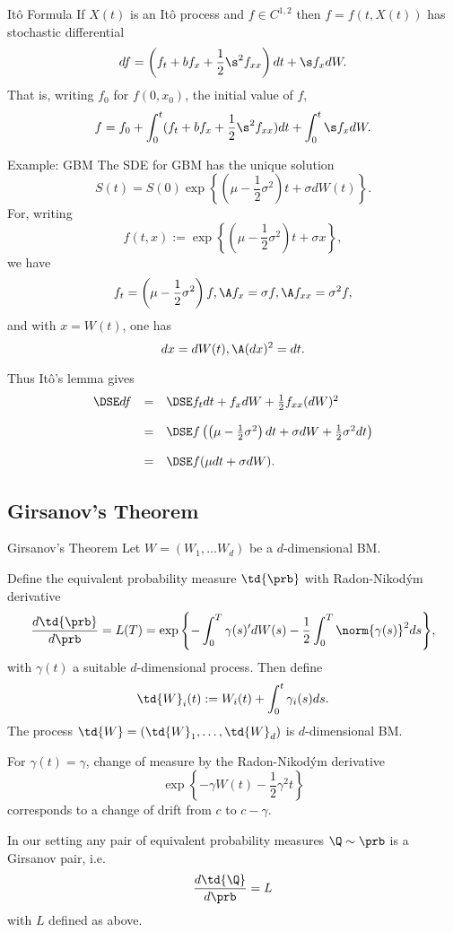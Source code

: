 It{\^o} Formula
	If $X(t)$ is an It{\^o} process  and $f \in C^{1,2}$ then
	$f = f(t,X(t))$ has stochastic differential
		$$
		df = \left(f_t + b f_x + \frac{1}{2} \s^2 f_{xx}\right) dt + \s
		f_x dW.
		$$
	That is, writing $f_0$ for $f(0, x_0)$, the initial value of $f$,
		$$
		f = f_0 + \int_0^t (f_t + b f_x + \frac{1}{2} \s^2 f_{xx})dt +
		\int_0^t \s f_x dW.
		$$
	

Example: GBM
	The SDE for GBM has the unique
	solution
		$$
		S(t) = S(0) \exp \left\{\left(\mu - \frac{1}{2}\sigma^2\right)t +
		\sigma dW(t) \right\}\!.
		$$
	For, writing
		$$
		f(t,x) := \exp\left\{\left(\mu - \frac{1}{2}\sigma^2\right)t +
		\sigma x \right\}\!,
		$$
	we have
		$$
		f_t = \left(\mu - \frac{1}{2}\sigma^2\right)f, \A f_x = \sigma f,
		\A f_{xx} = \sigma^2 f,
		$$
	and with $x = W(t)$, one has
		$$
		dx = dW(t), \A (dx)^2 = dt.
		$$
	
	Thus It\^{o}'s lemma gives
		$$
		\begin{array}{lll}
		\DSE df &=&\DSE f_t dt + f_x dW + \frac{1}{2} f_{xx}
		(dW)^2\\*[12pt] &=&\DSE f\left(\left(\mu -
		\frac{1}{2}{\sigma}^2\right) dt + \sigma dW +
		\frac{1}{2}{\sigma}^2 dt\right)\\*[12pt] &=&\DSE f(\mu dt + \sigma
		dW).
		\end{array}
		$$


\subsection{Girsanov's Theorem}
Girsanov's Theorem
	Let $W = (W_1, \ldots W_d)$ be a
	$d$-dimensional BM.
		\begin{theorem} [ Girsanov]
		Define the equivalent probability measure $\td{\prb}$ with Radon-Nikod\'{y}m derivative
			$$
			\frac{d\td{\prb}}{d\prb} =L(T)= \exp\left\{- \int_0^T \gamma(s)' dW(s) - \frac{1}{2}
			\int_0^T \norm{\gamma(s)}^2 ds \right\}\!,
			$$
		with $\gamma(t)$ a suitable $d$-dimensional process. Then define
			$$
			\td{W}_i(t) := W_i(t) + \int_0^t \gamma_i(s) ds.
			$$
		The process $\td{W} = (\td{W}_1, \ldots, \td{W}_d)$ is $d$-dimensional BM.
		\end{theorem}

		For $\gamma(t)= \gamma$, change of measure by the Radon-Nikod\'{y}m derivative
			$$
			\exp\left\{- \gamma W(t) - \frac{1}{2} {\gamma}^2 t\right\}
			$$
		corresponds to a change of drift from $c$ to $c - \gamma$.

		In our setting any pair of equivalent probability measures $\Q \sim
		\prb$ is a Girsanov pair, i.e.
			$$
			\frac{d\td{\Q}}{d\prb} =L
			$$
		with $L$ defined as above.

